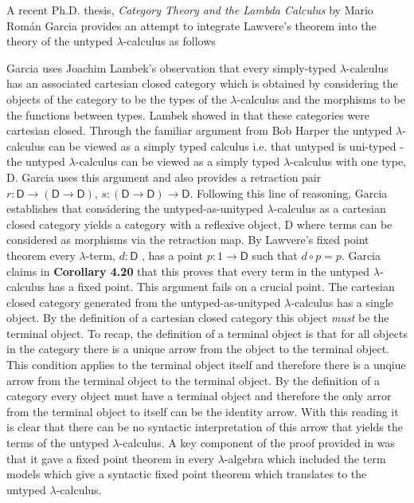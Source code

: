 \label{quote:prior}

A recent Ph.D. thesis, \textit{Category Theory and the Lambda Calculus} by Mario
Rom\'an Garcia provides an attempt to integrate Lawvere's theorem into the
theory of the untyped $\lambda$-calculus as follows

Garcia uses Joachim Lambek's observation that every simply-typed
$\lambda$-calculus has an associated cartesian closed category which is obtained
by considering the objects of the category to be the types of the
$\lambda$-calculus and the morphisms to be the functions between types. Lambek
showed in  that these categories were cartesian closed. Through the
familiar argument from  Bob Harper the untyped $\lambda$-calculus can
be viewed as a simply typed calculus i.e.  that untyped is uni-typed - the
untyped $\lambda$-calculus can be viewed as a simply typed $\lambda$-calculus
with one type, \textsf{D}. Garcia uses this argument and also provides a
retraction pair $r : \textsf{D} \rightarrow (\textsf{D} \rightarrow
\textsf{D})$, $s : (\textsf{D} \rightarrow \textsf{D}) \rightarrow \textsf{D}$.
Following this line of reasoning, Garcia establishes that considering the
untyped-as-unityped $\lambda$-calculus as a cartesian closed category yields a
category with a reflexive object, \textsf{D} where terms can be considered as
morphisms via the retraction map. By Lawvere's fixed point theorem every
$\lambda$-term, $d : \textsf{D}$ , has a point $p: 1 \rightarrow \textsf{D}$
such that $d \circ p = p$. Garcia claims in \textbf{Corollary 4.20} that this
proves that every term in the untyped $\lambda$-calculus has a fixed point. This
argument fails on a crucial point. The cartesian closed category generated from
the untyped-as-unityped $\lambda$-calculus has a single object. By the
definition of a cartesian closed category this object \textit{must} be the
terminal object. To recap, the definition of a terminal object is that for all
objects in the category there is a unique arrow from the object to the terminal
object. This condition applies to the terminal object itself and therefore there
is a unqiue arrow from the terminal object to the terminal object. By the
definition of a category every object must have a terminal object and therefore
the only arror from the terminal object to itself can be the identity arrow.
With this reading it is clear that there can be no syntactic interpretation of
this arrow that yields the terms of the untyped $\lambda$-calculus. A key
component of the proof provided in  was that it gave a fixed point
theorem in every $\lambda$-algebra which included the term models which give a
syntactic fixed point theorem which translates to the untyped
$\lambda$-calculus.

